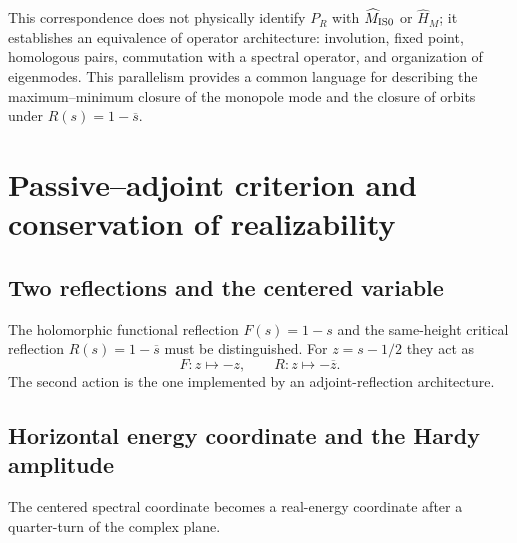 \documentclass[11pt]{amsart}
\theoremstyle{definition}
\theoremstyle{remark}
\begin{document}
This correspondence does not physically identify $P_R$ with $\widehat M_{\rm IS0}$ or $\widehat H_M$; it establishes an equivalence of operator architecture: involution, fixed point, homologous pairs, commutation with a spectral operator, and organization of eigenmodes. This parallelism provides a common language for describing the maximum--minimum closure of the monopole mode and the closure of orbits under $R(s)=1-\overline{s}$.

\section{Passive--adjoint criterion and conservation of realizability}

\subsection{Two reflections and the centered variable}
The holomorphic functional reflection $F(s)=1-s$ and the same-height critical reflection
$R(s)=1-\overline s$ must be distinguished.  For $z=s-1/2$ they act as
\begin{equation}
 F:z\mapsto-z,
 \qquad
 R:z\mapsto-\overline z.
\end{equation}
The second action is the one implemented by an adjoint-reflection architecture.

\subsection{Horizontal energy coordinate and the Hardy amplitude}
The centered spectral coordinate becomes a real-energy coordinate after a quarter-turn of
the complex plane.
\end{document}
